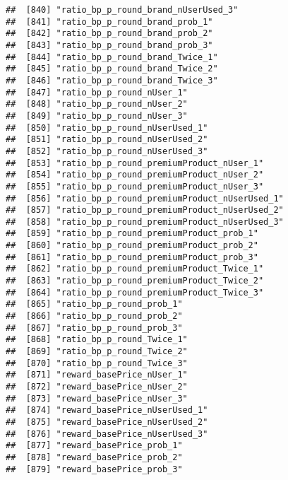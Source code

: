 \documentclass[10pt]{report}
\begin{document}
\begin{verbatim}
##  [840] "ratio_bp_p_round_brand_nUserUsed_3"                   
##  [841] "ratio_bp_p_round_brand_prob_1"                        
##  [842] "ratio_bp_p_round_brand_prob_2"                        
##  [843] "ratio_bp_p_round_brand_prob_3"                        
##  [844] "ratio_bp_p_round_brand_Twice_1"                       
##  [845] "ratio_bp_p_round_brand_Twice_2"                       
##  [846] "ratio_bp_p_round_brand_Twice_3"                       
##  [847] "ratio_bp_p_round_nUser_1"                             
##  [848] "ratio_bp_p_round_nUser_2"                             
##  [849] "ratio_bp_p_round_nUser_3"                             
##  [850] "ratio_bp_p_round_nUserUsed_1"                         
##  [851] "ratio_bp_p_round_nUserUsed_2"                         
##  [852] "ratio_bp_p_round_nUserUsed_3"                         
##  [853] "ratio_bp_p_round_premiumProduct_nUser_1"              
##  [854] "ratio_bp_p_round_premiumProduct_nUser_2"              
##  [855] "ratio_bp_p_round_premiumProduct_nUser_3"              
##  [856] "ratio_bp_p_round_premiumProduct_nUserUsed_1"          
##  [857] "ratio_bp_p_round_premiumProduct_nUserUsed_2"          
##  [858] "ratio_bp_p_round_premiumProduct_nUserUsed_3"          
##  [859] "ratio_bp_p_round_premiumProduct_prob_1"               
##  [860] "ratio_bp_p_round_premiumProduct_prob_2"               
##  [861] "ratio_bp_p_round_premiumProduct_prob_3"               
##  [862] "ratio_bp_p_round_premiumProduct_Twice_1"              
##  [863] "ratio_bp_p_round_premiumProduct_Twice_2"              
##  [864] "ratio_bp_p_round_premiumProduct_Twice_3"              
##  [865] "ratio_bp_p_round_prob_1"                              
##  [866] "ratio_bp_p_round_prob_2"                              
##  [867] "ratio_bp_p_round_prob_3"                              
##  [868] "ratio_bp_p_round_Twice_1"                             
##  [869] "ratio_bp_p_round_Twice_2"                             
##  [870] "ratio_bp_p_round_Twice_3"                             
##  [871] "reward_basePrice_nUser_1"                             
##  [872] "reward_basePrice_nUser_2"                             
##  [873] "reward_basePrice_nUser_3"                             
##  [874] "reward_basePrice_nUserUsed_1"                         
##  [875] "reward_basePrice_nUserUsed_2"                         
##  [876] "reward_basePrice_nUserUsed_3"                         
##  [877] "reward_basePrice_prob_1"                              
##  [878] "reward_basePrice_prob_2"                              
##  [879] "reward_basePrice_prob_3"                              

\end{verbatim}
\end{document}

